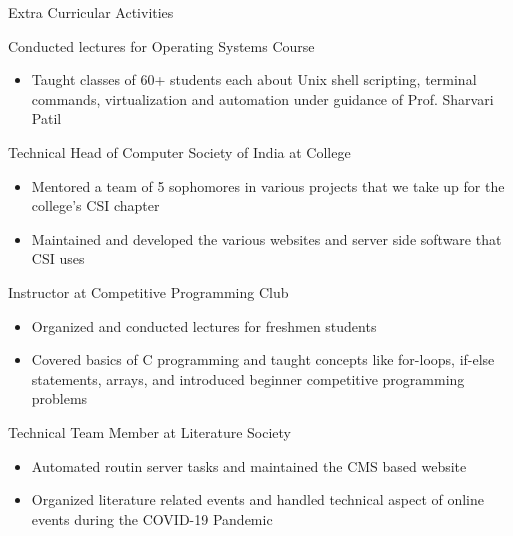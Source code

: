 \documentclass{article}
\newlength{\tabin}
\newlength{\secsep}
\newcommand{\lineunder}{\vspace*{-8pt} \\ \hspace*{-6pt} \hrulefill \\ \vspace*{-15pt}}
\newenvironment{tabbedsection}[1]{
	\begin{list}{}{
		\setlength{\itemsep}{0pt}
		\setlength{\labelsep}{0pt}
		\setlength{\labelwidth}{0pt}
		\setlength{\leftmargin}{\tabin}
		\setlength{\rightmargin}{\tabin}
		\setlength{\listparindent}{0pt}
		\setlength{\parsep}{0pt}
		\setlength{\parskip}{0pt}
		\setlength{\partopsep}{0pt}
		\setlength{\topsep}{#1}
	}
	\item[]
}{\end{list}}
\newenvironment{resume_section}[1]{
	\filbreak
	\vspace{2\secsep}
	\textsc{\large#1}
	\lineunder
	\begin{tabbedsection}{\secsep}
}{\end{tabbedsection}}
\newenvironment{resume_subsection}[2][]{
	\textbf{#2} \hfill {\footnotesize #1} \hspace{2em}
	\begin{tabbedsection}{0.5\secsep}
}{\end{tabbedsection}}
\newenvironment{subitems}{
	\renewcommand{\labelitemi}{-}
	\begin{itemize}
		\setlength{\labelsep}{1em}
}{\end{itemize}}
\begin{document}
\begin{resume_section}{Extra Curricular Activities}

	\begin{resume_subsection}{Conducted lectures for Operating Systems Course}
		\begin{subitems}
			\item   Taught classes of 60+ students each about Unix
				shell scripting, terminal commands,
				virtualization and automation under guidance of Prof. Sharvari Patil
		\end{subitems}
	\end{resume_subsection}

	\begin{resume_subsection}{Technical Head of Computer Society of India at College}
		\begin{subitems}
			\item Mentored a team of 5 sophomores in various
				projects that we take up for the college's CSI
				chapter
			\item Maintained and developed the various websites and server
				side software that CSI uses
		\end{subitems}
	\end{resume_subsection}

	\begin{resume_subsection}{Instructor at Competitive Programming Club}
		\begin{subitems}
			\item   Organized and conducted lectures for freshmen students
			\item   Covered basics of C programming and taught
				concepts like for-loops, if-else statements,
				arrays, and introduced beginner competitive
				programming problems
		\end{subitems}
	\end{resume_subsection}

	\begin{resume_subsection}{Technical Team Member at Literature Society}
		\begin{subitems}
		\item Automated routin server tasks and maintained the CMS based website
		\item Organized literature related events and handled technical
			aspect of online events during the COVID-19 Pandemic
		\end{subitems}
	\end{resume_subsection}
\end{resume_section}
\end{document}
